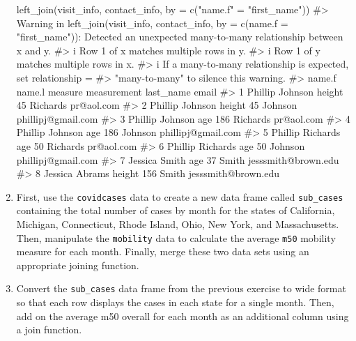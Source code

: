 \documentclass[
  letterpaper,
]{krantz}
\makeatletter
\newenvironment{Shaded}{\begin{snugshade}}{\end{snugshade}}
\newcommand{\AttributeTok}[1]{\textcolor[rgb]{0.40,0.45,0.13}{#1}}
\newcommand{\CommentTok}[1]{\textcolor[rgb]{0.37,0.37,0.37}{#1}}
\newcommand{\FunctionTok}[1]{\textcolor[rgb]{0.28,0.35,0.67}{#1}}
\newcommand{\NormalTok}[1]{\textcolor[rgb]{0.00,0.23,0.31}{#1}}
\newcommand{\OtherTok}[1]{\textcolor[rgb]{0.00,0.23,0.31}{#1}}
\newcommand{\StringTok}[1]{\textcolor[rgb]{0.13,0.47,0.30}{#1}}
\newenvironment{kframe}{%
\medskip{}
\setlength{\fboxsep}{.8em}
 \def\at@end@of@kframe{}%
 \ifinner\ifhmode%
  \def\at@end@of@kframe{\end{minipage}}%
  \begin{minipage}{\columnwidth}%
 \fi\fi%
 \def\FrameCommand##1{\hskip\@totalleftmargin \hskip-\fboxsep
 \colorbox{shadecolor}{##1}\hskip-\fboxsep
     \hskip-\linewidth \hskip-\@totalleftmargin \hskip\columnwidth}%
 \MakeFramed {\advance\hsize-\width
   \@totalleftmargin\z@ \linewidth\hsize
   \@setminipage}}%
 {\par\unskip\endMakeFramed%
 \at@end@of@kframe}
\renewenvironment{Shaded}{\begin{kframe}}{\end{kframe}}
\makeatother
\begin{document}
\begin{enumerate}
\begin{Shaded}
\begin{Highlighting}[]
\FunctionTok{left\_join}\NormalTok{(visit\_info, contact\_info, }
          \AttributeTok{by =} \FunctionTok{c}\NormalTok{(}\StringTok{"name.f"} \OtherTok{=} \StringTok{"first\_name"}\NormalTok{))}
\CommentTok{\#\textgreater{} Warning in left\_join(visit\_info, contact\_info, by = c(name.f = "first\_name")): Detected an unexpected many{-}to{-}many relationship between \textasciigrave{}x\textasciigrave{} and \textasciigrave{}y\textasciigrave{}.}
\CommentTok{\#\textgreater{} i Row 1 of \textasciigrave{}x\textasciigrave{} matches multiple rows in \textasciigrave{}y\textasciigrave{}.}
\CommentTok{\#\textgreater{} i Row 1 of \textasciigrave{}y\textasciigrave{} matches multiple rows in \textasciigrave{}x\textasciigrave{}.}
\CommentTok{\#\textgreater{} i If a many{-}to{-}many relationship is expected, set \textasciigrave{}relationship =}
\CommentTok{\#\textgreater{}   "many{-}to{-}many"\textasciigrave{} to silence this warning.}
\CommentTok{\#\textgreater{}    name.f   name.l measure measurement last\_name               email}
\CommentTok{\#\textgreater{} 1 Phillip  Johnson  height          45  Richards          pr@aol.com}
\CommentTok{\#\textgreater{} 2 Phillip  Johnson  height          45   Johnson  phillipj@gmail.com}
\CommentTok{\#\textgreater{} 3 Phillip  Johnson     age         186  Richards          pr@aol.com}
\CommentTok{\#\textgreater{} 4 Phillip  Johnson     age         186   Johnson  phillipj@gmail.com}
\CommentTok{\#\textgreater{} 5 Phillip Richards     age          50  Richards          pr@aol.com}
\CommentTok{\#\textgreater{} 6 Phillip Richards     age          50   Johnson  phillipj@gmail.com}
\CommentTok{\#\textgreater{} 7 Jessica    Smith     age          37     Smith jesssmith@brown.edu}
\CommentTok{\#\textgreater{} 8 Jessica   Abrams  height         156     Smith jesssmith@brown.edu}
\end{Highlighting}
\end{Shaded}
\item
  First, use the \texttt{covidcases} data to create a new data frame
  called \texttt{sub\_cases} containing the total number of cases by
  month for the states of California, Michigan, Connecticut, Rhode
  Island, Ohio, New York, and Massachusetts. Then, manipulate the
  \texttt{mobility} data to calculate the average \texttt{m50} mobility
  measure for each month. Finally, merge these two data sets using an
  appropriate joining function.
\item
  Convert the \texttt{sub\_cases} data frame from the previous exercise
  to wide format so that each row displays the cases in each state for a
  single month. Then, add on the average m50 overall for each month as
  an additional column using a join function.
\end{enumerate}
\end{document}
